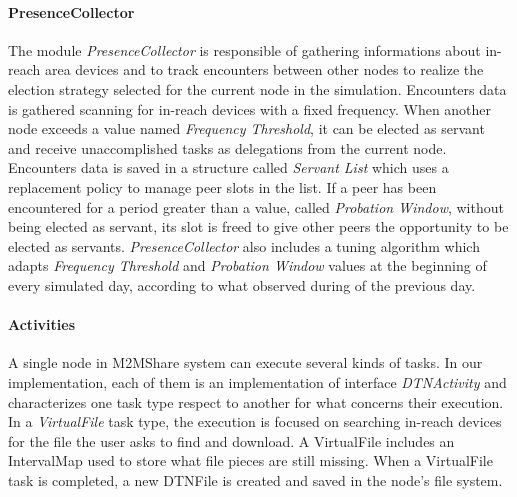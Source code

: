 
\paragraph{PresenceCollector}
The module \textit{PresenceCollector} is responsible of gathering informations about in-reach area devices and to track encounters between other nodes to realize the election strategy selected for the current node in the simulation. Encounters data is gathered scanning for in-reach devices with a fixed frequency. When another node exceeds a value named \textit{Frequency Threshold}, it can be elected as servant and receive unaccomplished tasks as delegations from the current node. Encounters data is saved in a structure called \textit{Servant List} which uses a replacement policy to manage peer slots in the list. If a peer has been encountered for a period greater than a value, called \textit{Probation Window}, without being elected as servant, its slot is freed to give other peers the opportunity to be elected as servants. \textit{PresenceCollector} also includes a tuning algorithm which adapts \textit{Frequency Threshold} and \textit{Probation Window} values at the beginning of every simulated day, according to what observed during of the previous day.


\paragraph{Activities}
A single node in M2MShare system can execute several kinds of tasks. In our implementation, each of them is an implementation of interface \textit{DTNActivity} and characterizes one task type respect to another for what concerns their execution. 
\\

In a \textit{VirtualFile} task type, the execution is focused on searching in-reach devices for the file the user asks to find and download. A VirtualFile includes an IntervalMap used to store what file pieces are still missing. When a VirtualFile task is completed, a new DTNFile is created and saved in the node's file system. 
\\

